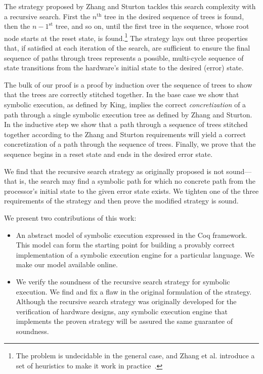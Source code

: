 The strategy proposed by Zhang and Sturton tackles this search complexity with a
recursive search. First the $n^{\mathrm{th}}$ tree in the desired sequence of
trees is found, then the $n-1^{\mathrm{st}}$ tree, and so on, until the first
tree in the sequence, whose root node starts at the reset state, is
found.\footnote{The problem is undecidable in the general case, and Zhang et
  al. introduce a set of heuristics to make it work in
  practice~\cite{zhang2018end}.} The strategy lays out three properties that, if
satisfied at each iteration of the search, are sufficient to ensure the final
sequence of paths through trees represents a possible, multi-cycle sequence of
state transitions from the hardware's initial state to the desired (error)
state.

The bulk of our proof is a proof by induction over the sequence of trees to show
that the trees are correctly stitched together. In the base case we show that
symbolic
execution, as defined by King, implies the correct \emph{concretization} of a path through a
single symbolic execution tree as defined by Zhang and Sturton. In the inductive
step we show that a path through a sequence of trees stitched together according
to the Zhang and Sturton requirements will yield a correct concretization of a
path through the sequence of trees. Finally, we prove that the sequence begins in a reset state and ends in the
desired error state.

We find that the recursive search strategy as originally proposed is not sound---that is, the
search may find a symbolic path for which no concrete path from the processor's initial state
to the given error state exists. We tighten one of the three
requirements of the strategy and then prove the modified strategy is sound.

We present two contributions of this work:
\begin{itemize}
  \item An abstract model of symbolic execution expressed in the Coq
    framework. This model can form the starting point for 
    building a provably correct implementation of a symbolic execution engine for a
    particular language. We make our model available online.
\item We verify the soundness of the recursive search strategy for symbolic
  execution. We find and fix a flaw in the original formulation of the
  strategy. Although the recursive search strategy was originally developed for
  the verification of hardware designs, any symbolic execution engine that
  implements the proven strategy will be assured the same guarantee of soundness.
\end{itemize}
